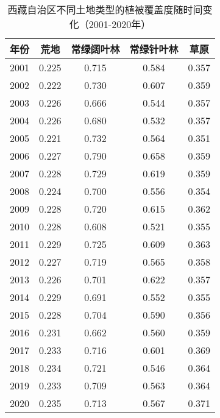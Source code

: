 \documentclass[AutoFakeBold]{LZUThesis-PgD&PhD}
\begin{document}
        
            \begin{table}[H]
                \centering
                \begin{tabular}{|c|c|c|c|c|}
                    \hline
                    \textbf{年份} & \textbf{荒地} & \textbf{常绿阔叶林} & \textbf{常绿针叶林} & \textbf{草原} \\
                    \hline
                    2001 & 0.225 & 0.715 & 0.584 & 0.357 \\
                    2002 & 0.222 & 0.730 & 0.607 & 0.359 \\
                    2003 & 0.226 & 0.666 & 0.544 & 0.357 \\
                    2004 & 0.226 & 0.680 & 0.532 & 0.357 \\
                    2005 & 0.221 & 0.732 & 0.564 & 0.351 \\
                    2006 & 0.227 & 0.790 & 0.658 & 0.359 \\
                    2007 & 0.228 & 0.729 & 0.619 & 0.359 \\
                    2008 & 0.224 & 0.700 & 0.556 & 0.354 \\
                    2009 & 0.228 & 0.720 & 0.615 & 0.362 \\
                    2010 & 0.228 & 0.608 & 0.521 & 0.355 \\
                    2011 & 0.229 & 0.725 & 0.609 & 0.363 \\
                    2012 & 0.227 & 0.719 & 0.565 & 0.358 \\
                    2013 & 0.226 & 0.701 & 0.622 & 0.357 \\
                    2014 & 0.229 & 0.691 & 0.552 & 0.355 \\
                    2015 & 0.228 & 0.704 & 0.590 & 0.356 \\
                    2016 & 0.231 & 0.662 & 0.560 & 0.359 \\
                    2017 & 0.233 & 0.716 & 0.601 & 0.369 \\
                    2018 & 0.234 & 0.721 & 0.546 & 0.364 \\
                    2019 & 0.233 & 0.709 & 0.563 & 0.364 \\
                    2020 & 0.235 & 0.713 & 0.567 & 0.371 \\
                    \hline
                \end{tabular}
                \caption{西藏自治区不同土地类型的植被覆盖度随时间变化（2001-2020年）}
            \end{table}
\end{document}
